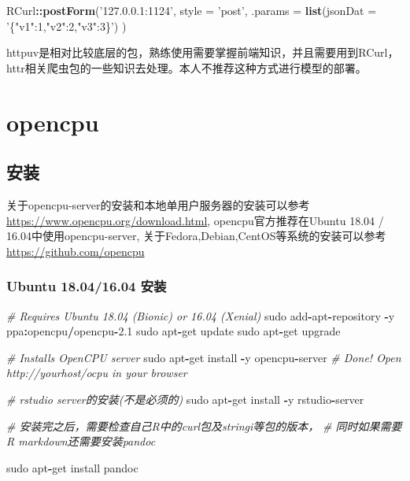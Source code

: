 \documentclass[]{book}
\newenvironment{Shaded}{\begin{snugshade}}{\end{snugshade}}
\newcommand{\KeywordTok}[1]{\textcolor[rgb]{0.13,0.29,0.53}{\textbf{#1}}}
\newcommand{\DataTypeTok}[1]{\textcolor[rgb]{0.13,0.29,0.53}{#1}}
\newcommand{\FloatTok}[1]{\textcolor[rgb]{0.00,0.00,0.81}{#1}}
\newcommand{\StringTok}[1]{\textcolor[rgb]{0.31,0.60,0.02}{#1}}
\newcommand{\CommentTok}[1]{\textcolor[rgb]{0.56,0.35,0.01}{\textit{#1}}}
\newcommand{\OperatorTok}[1]{\textcolor[rgb]{0.81,0.36,0.00}{\textbf{#1}}}
\newcommand{\NormalTok}[1]{#1}
\begin{document}
\begin{Shaded}
\begin{Highlighting}[]

\NormalTok{RCurl}\OperatorTok{::}\KeywordTok{postForm}\NormalTok{(}\StringTok{'127.0.0.1:1124'}\NormalTok{,}
\DataTypeTok{style =} \StringTok{'post'}\NormalTok{,}
\DataTypeTok{.params =} \KeywordTok{list}\NormalTok{(}\DataTypeTok{jsonDat =} \StringTok{'\{"v1":1,"v2":2,"v3":3\}'}\NormalTok{)}
\NormalTok{)}
\end{Highlighting}
\end{Shaded}

httpuv是相对比较底层的包，熟练使用需要掌握前端知识，并且需要用到RCurl，httr相关爬虫包的一些知识去处理。本人不推荐这种方式进行模型的部署。

\chapter{opencpu}\label{opencpu}

\section{安装}

关于opencpu-server的安装和本地单用户服务器的安装可以参考
\url{https://www.opencpu.org/download.html}, opencpu官方推荐在Ubuntu
18.04 / 16.04中使用opencpu-server,
关于Fedora,Debian,CentOS等系统的安装可以参考\url{https://github.com/opencpu}

\subsection{Ubuntu 18.04/16.04 安装}\label{ubuntu-18.0416.04-}

\begin{Shaded}
\begin{Highlighting}[]
\CommentTok{# Requires Ubuntu 18.04 (Bionic) or 16.04 (Xenial)}
\NormalTok{sudo add}\OperatorTok{-}\NormalTok{apt}\OperatorTok{-}\NormalTok{repository }\OperatorTok{-}\NormalTok{y ppa}\OperatorTok{:}\NormalTok{opencpu}\OperatorTok{/}\NormalTok{opencpu}\OperatorTok{-}\FloatTok{2.1}
\NormalTok{sudo apt}\OperatorTok{-}\NormalTok{get update }
\NormalTok{sudo apt}\OperatorTok{-}\NormalTok{get upgrade}

\CommentTok{# Installs OpenCPU server}
\NormalTok{sudo apt}\OperatorTok{-}\NormalTok{get install }\OperatorTok{-}\NormalTok{y opencpu}\OperatorTok{-}\NormalTok{server}
\CommentTok{# Done! Open http://yourhost/ocpu in your browser}

\CommentTok{# rstudio server的安装(不是必须的)}
\NormalTok{sudo apt}\OperatorTok{-}\NormalTok{get install }\OperatorTok{-}\NormalTok{y rstudio}\OperatorTok{-}\NormalTok{server }

\CommentTok{# 安装完之后，需要检查自己R中的curl包及stringi等包的版本，}
\CommentTok{# 同时如果需要R markdown还需要安装pandoc}

\NormalTok{sudo apt}\OperatorTok{-}\NormalTok{get install pandoc}
\end{Highlighting}
\end{Shaded}
\end{document}
